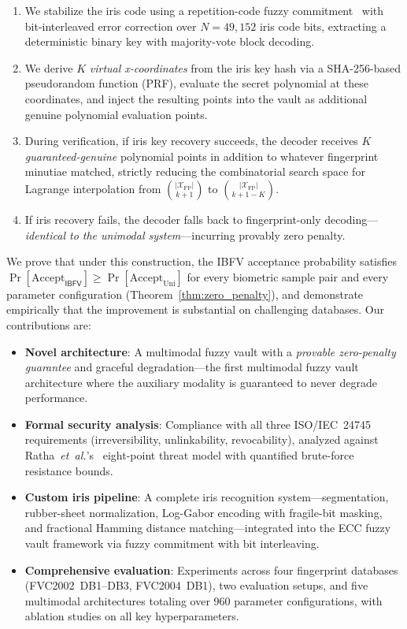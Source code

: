 \documentclass[3p,twocolumn]{elsarticle}
\newcommand{\IBFV}{\textsf{IBFV}}
\begin{document}
\begin{enumerate}
    \item We stabilize the iris code using a repetition-code fuzzy commitment~\cite{hao2006combining} with bit-interleaved error correction over $N = 49{,}152$ iris code bits, extracting a deterministic binary key with majority-vote block decoding.
    \item We derive $K$ \emph{virtual x-coordinates} from the iris key hash via a SHA-256-based pseudorandom function (PRF), evaluate the secret polynomial at these coordinates, and inject the resulting points into the vault as additional genuine polynomial evaluation points.
    \item During verification, if iris key recovery succeeds, the decoder receives $K$ \emph{guaranteed-genuine} polynomial points in addition to whatever fingerprint minutiae matched, strictly reducing the combinatorial search space for Lagrange interpolation from $\binom{|\mathcal{X}_{\text{FP}}|}{k+1}$ to $\binom{|\mathcal{X}_{\text{FP}}|}{k+1-K}$.
    \item If iris recovery fails, the decoder falls back to fingerprint-only decoding---\emph{identical to the unimodal system}---incurring provably zero penalty.
\end{enumerate}

We prove that under this construction, the \IBFV{} acceptance probability satisfies $\Pr[\text{Accept}_{\IBFV}] \geq \Pr[\text{Accept}_{\text{Uni}}]$ for every biometric sample pair and every parameter configuration (Theorem~\ref{thm:zero_penalty}), and demonstrate empirically that the improvement is substantial on challenging databases. Our contributions are:

\begin{itemize}
    \item \textbf{Novel architecture}: A multimodal fuzzy vault with a \emph{provable zero-penalty guarantee} and graceful degradation---the first multimodal fuzzy vault architecture where the auxiliary modality is guaranteed to never degrade performance.
    \item \textbf{Formal security analysis}: Compliance with all three ISO/IEC~24745 requirements (irreversibility, unlinkability, revocability), analyzed against Ratha~\textit{et~al.}'s~\cite{ratha2001enhancing} eight-point threat model with quantified brute-force resistance bounds.
    \item \textbf{Custom iris pipeline}: A complete iris recognition system---segmentation, rubber-sheet normalization, Log-Gabor encoding with fragile-bit masking, and fractional Hamming distance matching---integrated into the ECC fuzzy vault framework via fuzzy commitment with bit interleaving.
    \item \textbf{Comprehensive evaluation}: Experiments across four fingerprint databases (FVC2002~DB1--DB3, FVC2004~DB1), two evaluation setups, and five multimodal architectures totaling over 960 parameter configurations, with ablation studies on all key hyperparameters.
\end{itemize}
\end{document}
